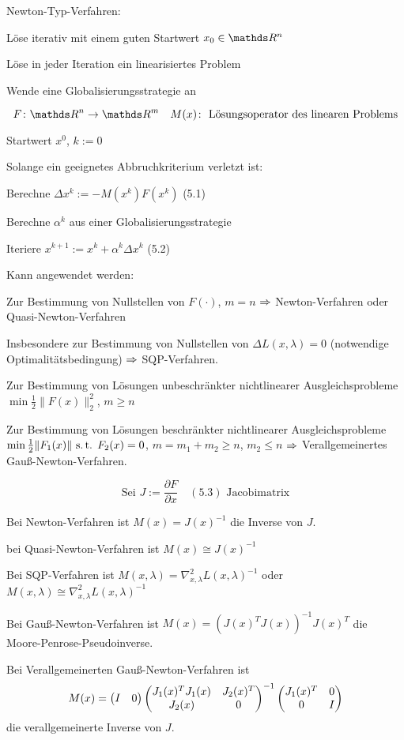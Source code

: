 

Newton-Typ-Verfahren:

\bitm
\item Löse iterativ mit einem guten Startwert $x_0 \in \R^n$
\item Löse in jeder Iteration ein linearisiertes Problem
\item Wende eine Globalisierungsstrategie an
\eitm

\[ F\colon \R^n \to \R^m \quad M(x)\colon \text{ Lösungsoperator des linearen Problems} \]


\bitm
\item Startwert $x^0$, $k := 0$
\item Solange ein geeignetes Abbruchkriterium verletzt ist:
\bitm
	\item Berechne $\Delta x^k := - M(x^k) F(x^k)$ (5.1)
	\item Berechne $\alpha^k$ aus einer Globalisierungsstrategie
	\item Iteriere $x^{k+1} := x^k + \alpha^k \Delta x^k$ (5.2)
\eitm
\eitm

Kann angewendet werden:

\bitm
\item Zur Bestimmung von Nullstellen von $F(\cdot)$, $m=n$ $\Rightarrow$ Newton-Verfahren oder Quasi-Newton-Verfahren
\item Insbesondere zur Bestimmung von Nullstellen von $\Delta L(x,\lambda) = 0$ (notwendige Optimalitätsbedingung) $\Rightarrow$ SQP-Verfahren.
\item Zur Bestimmung von Lösungen unbeschränkter nichtlinearer Ausgleichsprobleme $\min \frac 12 \|F(x)\|_2^2$, $m \geq n$
\item Zur Bestimmung von Lösungen beschränkter nichtlinearer Ausgleichsprobleme $\min \frac 12 \|F_1(x)\| \text{ s.\,t. } F_2(x) = 0$, $m = m_1+m_2 \geq n$, $m_2 \leq n$ $\Rightarrow$ Verallgemeinertes Gauß-Newton-Verfahren.
\eitm

\[ \text{Sei } J := \frac{\partial F}{\partial x} \quad (5.3) \text{ Jacobimatrix} \]


\bitm
\item Bei Newton-Verfahren ist $M(x) = J(x)^{-1}$ die Inverse von $J$.
\item bei Quasi-Newton-Verfahren ist $M(x) \cong J(x)^{-1}$
\item Bei SQP-Verfahren ist $M(x, \lambda) = \nabla_{x,\lambda}^2 L(x, \lambda)^{-1}$ oder 
$M(x, \lambda) \cong \nabla_{x,\lambda}^2 L(x, \lambda)^{-1}$
\item Bei Gauß-Newton-Verfahren ist $M(x) = (J(x)^T J(x))^{-1} J(x)^T$ die Moore-Penrose-Pseudoinverse.
\item Bei Verallgemeinerten Gauß-Newton-Verfahren ist \[ M(x) = \begin{pmatrix} I & 0 \end{pmatrix} \begin{pmatrix} J_1(x)^T J_1(x) & J_2(x)^T \\ J_2(x) & 0 \end{pmatrix}^{-1} \begin{pmatrix} J_1(x)^T & 0 \\ 0 & I \end{pmatrix} \] die verallgemeinerte Inverse von $J$.
\eitm

